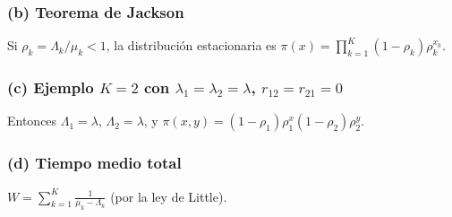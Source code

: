 \documentclass[letterpaper, 12pt]{article}
\newcommand{\1}{\mathbbm{1}}
\begin{document}
    \subsubsection*{(b) Teorema de Jackson}
    Si $\rho_k=\Lambda_k/\mu_k<1$, la distribuci\'on estacionaria es $\pi(x)=\prod_{k=1}^K(1-\rho_k)\rho_k^{x_k}$.

    \subsubsection*{(c) Ejemplo $K=2$ con $\lambda_1=\lambda_2=\lambda$, $r_{12}=r_{21}=0$}
    Entonces $\Lambda_1=\lambda$, $\Lambda_2=\lambda$, y $\pi(x,y)=(1-\rho_1)\rho_1^x(1-\rho_2)\rho_2^y$.

    \subsubsection*{(d) Tiempo medio total}
    $W=\sum_{k=1}^K\frac{1}{\mu_k-\Lambda_k}$ (por la ley de Little).

    
    
\end{document}
